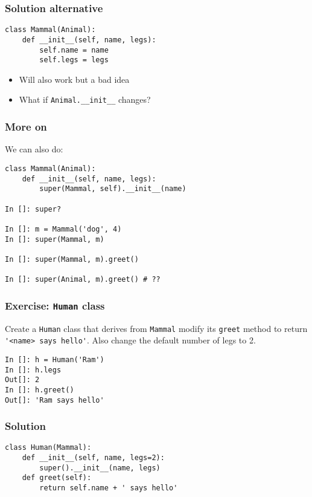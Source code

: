 \documentclass[14pt,compress,aspectratio=169]{beamer}
\begin{document}
\begin{frame}
  \frametitle{Solution alternative}
\begin{lstlisting}
class Mammal(Animal):
    def __init__(self, name, legs):
        self.name = name
        self.legs = legs
\end{lstlisting}
  \begin{itemize}
  \item Will also work but a \alert{bad} idea
  \item What if \lstinline{Animal.__init__} changes?
  \end{itemize}
\end{frame}

\begin{frame}
  \frametitle{More on }
We can also do:
\begin{lstlisting}
class Mammal(Animal):
    def __init__(self, name, legs):
        super(Mammal, self).__init__(name)

In []: super?

In []: m = Mammal('dog', 4)
In []: super(Mammal, m)

In []: super(Mammal, m).greet()

In []: super(Animal, m).greet() # ??
\end{lstlisting}
\end{frame}


\begin{frame}
  \frametitle{Exercise: \lstinline{Human} class}
  \begin{block}{}
    Create a \lstinline{Human} class that derives from \lstinline{Mammal}
    modify its \lstinline{greet} method to return
    \lstinline{'<name> says hello'}.  Also change the default number of legs
    to 2.
  \end{block}

\begin{lstlisting}
In []: h = Human('Ram')
In []: h.legs
Out[]: 2
In []: h.greet()
Out[]: 'Ram says hello'
\end{lstlisting}
\end{frame}

\begin{frame}
  \frametitle{Solution}
\begin{lstlisting}
class Human(Mammal):
    def __init__(self, name, legs=2):
        super().__init__(name, legs)
    def greet(self):
        return self.name + ' says hello'
\end{lstlisting}
\end{frame}
\end{document}
